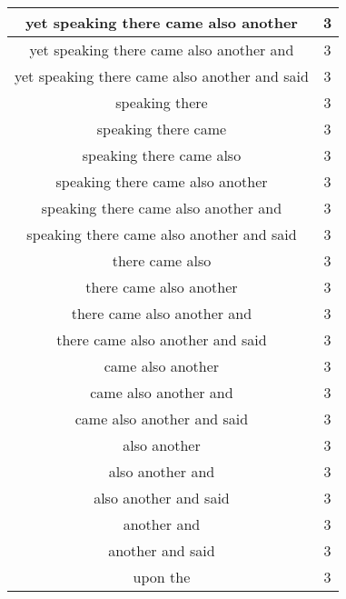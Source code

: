 \begin{center}
\begin{longtable}{|c|c|}
yet speaking there came also another & 3\\ \hline 
yet speaking there came also another and & 3\\ \hline 
yet speaking there came also another and said & 3\\ \hline 
speaking there & 3\\ \hline 
speaking there came & 3\\ \hline 
speaking there came also & 3\\ \hline 
speaking there came also another & 3\\ \hline 
speaking there came also another and & 3\\ \hline 
speaking there came also another and said & 3\\ \hline 
there came also & 3\\ \hline 
there came also another & 3\\ \hline 
there came also another and & 3\\ \hline 
there came also another and said & 3\\ \hline 
came also another & 3\\ \hline 
came also another and & 3\\ \hline 
came also another and said & 3\\ \hline 
also another & 3\\ \hline 
also another and & 3\\ \hline 
also another and said & 3\\ \hline 
another and & 3\\ \hline 
another and said & 3\\ \hline 
upon the & 3\\ \hline 
\end{longtable}
\end{center}





